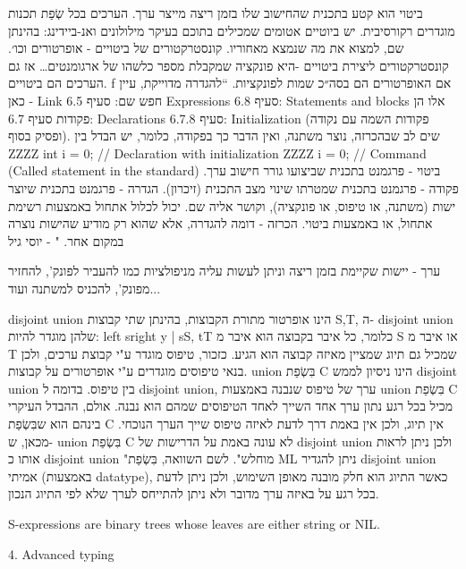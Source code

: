         ביטוי הוא קטע בתכנית שהחישוב שלו בזמן ריצה מייצר ערך. הערכים בכל שְׂפַת תכנות מוגדרים רקורסיבית. יש ביוטיים אטומים שמכילים בתוכם בעיקר מילולונים ואנ-ביידינג: בהינתן שם, למצוא את מה שנמצא מאחוריו.
        קונסטרקטורים של ביטויים - אופרטורים וכו׳.
        קונסטרקטורים ליצירת ביטויים -היא פונקציה שמקבלת מספר כלשהו של ארגומנטים… אז גם הערכים הם ביטויים. f אם האופרטורים הם בסה״כ שמות לפונקציות.
        “להגדרה מדוייקת, עיין כאן - Link
        חפש שם: סעיף 6.5 Expressions
        סעיף 6.8: Statements and blocks אלו הן פקודות
        סעיף 6.7: Declarations
        סעיף 6.7.8: Initialization (פקודות השמה עם נקודה ופסיק בסוף).
        שים לב שבהכרזה, נוצר משתנה, ואין הדבר כך בפקודה, כלומר, יש הבדל בין
        ZZZZ int i = 0; // Declaration with initialization
        ZZZZ i = 0; // Command (Called statement in the standard)
        ביטוי - פרגמנט בתכנית שביצועו גורר חישוב ערך.
        פקודה - פרגמנט בתכנית שמטרתו שינוי מצב התכנית (זיכרון).
        הגדרה - פרגמנט בתכנית שיוצר ישות (משתנה, או טיפוס, או פונקציה), וקושר אליה שם. יכול לכלול אתחול באמצעות רשימת אתחול, או באמצעות ביטוי.
        הכרזה - דומה להגדרה, אלא שהוא רק מודיע שהישות נוצרה במקום אחר. "
        - יוסי גיל

        ערך - יישות שקיימת בזמן ריצה וניתן לעשות עליה מניפולציות כמו להעביר לפונק', להחזיר מפונק', להכניס למשתנה ועוד...

        disjoint union הינו אופרטור מתורת הקבוצות, בהינתן שתי קבוצות S,T, ה- disjoint union שלהן מוגדר להיות:
        {left sright y | sS, tT}
        כלומר, כל איבר בקבוצה הוא איבר מ S או איבר מ T שמכיל גם תיוג שמציין מאיזה קבוצה הוא הגיע.
        כזכור, טיפוס מוגדר ע"י קבוצת ערכים, ולכן בנאי טיפוסים מוגדרים ע"י אופרטורים על קבוצות.
        union בִּשְׂפַת C הינו ניסיון לממש disjoint union בין טיפוס.
        בדומה ל disjoint union, ערך של טיפוס שנבנה באמצעות union בִּשְׂפַת C מכיל בכל רגע נתון ערך אחד השייך לאחד הטיפוסים שמהם הוא נבנה.
        אולם, ההבדל העיקרי בינהם הוא שבִּשְׂפַת C אין תיוג, ולכן אין באמת דרך לדעת לאיזה טיפוס שייך הערך הנוכחי.
        מכאן, ש- union בִּשְׂפַת C לא עונה באמת על הדרישות של disjoint union ולכן ניתן לראות אותו כ disjoint union "מוחלש".
        לשם השוואה, בִּשְׂפַת ML ניתן להגדיר disjoint union אמיתי (באמצעות datatype), כאשר התיוג הוא חלק מובנה מאופן השימוש, ולכן ניתן לדעת בכל רגע על באיזה ערך מדובר ולא ניתן להתייחס לערך שלא לפי התיוג הנכון.

        S-expressions are binary trees whose leaves are either string or NIL.

        4. Advanced typing

